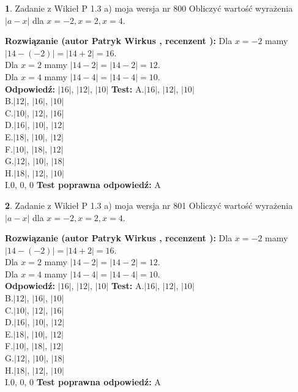 \documentclass[12pt, a4paper]{article}
\theoremstyle{definition} %
\newtheorem{zad}{}
\newcommand{\zadStart}[1]{\begin{zad}#1\newline}
\newcommand{\zadStop}{\end{zad}}
\newcommand{\rozwStart}[2]{\noindent \textbf{Rozwiązanie (autor #1 , recenzent #2): }\newline}
\newcommand{\rozwStop}{\newline}
\newcommand{\odpStart}{\noindent \textbf{Odpowiedź:}\newline}
\newcommand{\odpStop}{\newline}
\newcommand{\testStart}{\noindent \textbf{Test:}\newline}
\newcommand{\testStop}{\newline}
\newcommand{\kluczStart}{\noindent \textbf{Test poprawna odpowiedź:}\newline}
\newcommand{\kluczStop}{\newline}
\begin{document}
\zadStart{Zadanie z Wikieł P 1.3 a) moja wersja nr 800}
Obliczyć wartość wyrażenia $|a - x|$ dla $x=-2,x=2,x=4$.
\zadStop
\rozwStart{Patryk Wirkus}{}
Dla $x = -2$ mamy $|14 - (-2)| = |14 + 2| = 16$.\\
Dla $x = 2$ mamy $|14 - 2| = |14 - 2| = 12$.\\
Dla $x = 4$ mamy $|14 - 4| = |14 - 4| = 10$.\\
\rozwStop
\odpStart
$|16|$, $|12|$, $|10|$
\odpStop
\testStart
A.$|16|$, $|12|$, $|10|$\\
B.$|12|$, $|16|$, $|10|$\\
C.$|10|$, $|12|$, $|16|$\\
D.$|16|$, $|10|$, $|12|$\\
E.$|18|$, $|10|$, $|12|$\\
F.$|10|$, $|18|$, $|12|$\\
G.$|12|$, $|10|$, $|18|$\\
H.$|18|$, $|12|$, $|10|$\\
I.$0$, $0$, $0$
\testStop
\kluczStart
A
\kluczStop



\zadStart{Zadanie z Wikieł P 1.3 a) moja wersja nr 801}
Obliczyć wartość wyrażenia $|a - x|$ dla $x=-2,x=2,x=4$.
\zadStop
\rozwStart{Patryk Wirkus}{}
Dla $x = -2$ mamy $|14 - (-2)| = |14 + 2| = 16$.\\
Dla $x = 2$ mamy $|14 - 2| = |14 - 2| = 12$.\\
Dla $x = 4$ mamy $|14 - 4| = |14 - 4| = 10$.\\
\rozwStop
\odpStart
$|16|$, $|12|$, $|10|$
\odpStop
\testStart
A.$|16|$, $|12|$, $|10|$\\
B.$|12|$, $|16|$, $|10|$\\
C.$|10|$, $|12|$, $|16|$\\
D.$|16|$, $|10|$, $|12|$\\
E.$|18|$, $|10|$, $|12|$\\
F.$|10|$, $|18|$, $|12|$\\
G.$|12|$, $|10|$, $|18|$\\
H.$|18|$, $|12|$, $|10|$\\
I.$0$, $0$, $0$
\testStop
\kluczStart
A
\kluczStop
\end{document}
